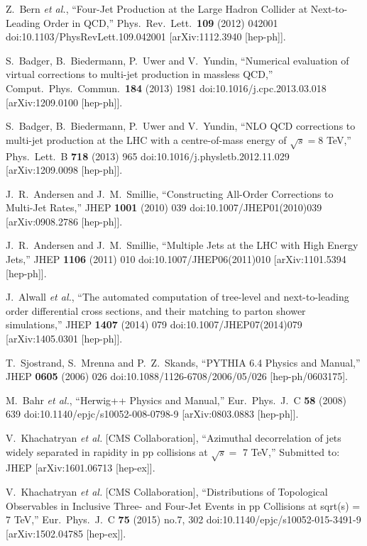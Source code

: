 \documentclass{PoS}
\begin{document}
\begin{thebibliography}{99}
  Z.~Bern {\it et al.},
  ``Four-Jet Production at the Large Hadron Collider at Next-to-Leading Order in QCD,''
  Phys.\ Rev.\ Lett.\  {\bf 109} (2012) 042001
  doi:10.1103/PhysRevLett.109.042001
  [arXiv:1112.3940 [hep-ph]].

  S.~Badger, B.~Biedermann, P.~Uwer and V.~Yundin,
  ``Numerical evaluation of virtual corrections to multi-jet production in massless QCD,''
  Comput.\ Phys.\ Commun.\  {\bf 184} (2013) 1981
  doi:10.1016/j.cpc.2013.03.018
  [arXiv:1209.0100 [hep-ph]].

  S.~Badger, B.~Biedermann, P.~Uwer and V.~Yundin,
  ``NLO QCD corrections to multi-jet production at the LHC with a centre-of-mass energy of $\sqrt{s}=8$ TeV,''
  Phys.\ Lett.\ B {\bf 718} (2013) 965
  doi:10.1016/j.physletb.2012.11.029
  [arXiv:1209.0098 [hep-ph]].

  J.~R.~Andersen and J.~M.~Smillie,
  ``Constructing All-Order Corrections to Multi-Jet Rates,''
  JHEP {\bf 1001} (2010) 039
  doi:10.1007/JHEP01(2010)039
  [arXiv:0908.2786 [hep-ph]].

  J.~R.~Andersen and J.~M.~Smillie,
  ``Multiple Jets at the LHC with High Energy Jets,''
  JHEP {\bf 1106} (2011) 010
  doi:10.1007/JHEP06(2011)010
  [arXiv:1101.5394 [hep-ph]].

  J.~Alwall {\it et al.},
  ``The automated computation of tree-level and next-to-leading order differential cross sections, and their matching to parton shower simulations,''
  JHEP {\bf 1407} (2014) 079
  doi:10.1007/JHEP07(2014)079
  [arXiv:1405.0301 [hep-ph]].

  T.~Sjostrand, S.~Mrenna and P.~Z.~Skands,
  ``PYTHIA 6.4 Physics and Manual,''
  JHEP {\bf 0605} (2006) 026
  doi:10.1088/1126-6708/2006/05/026
  [hep-ph/0603175].

  M.~Bahr {\it et al.},
  ``Herwig++ Physics and Manual,''
  Eur.\ Phys.\ J.\ C {\bf 58} (2008) 639
  doi:10.1140/epjc/s10052-008-0798-9
  [arXiv:0803.0883 [hep-ph]].

  V.~Khachatryan {\it et al.} [CMS Collaboration],
  ``Azimuthal decorrelation of jets widely separated in rapidity in pp collisions at $\sqrt{s} =$ 7 TeV,''
  Submitted to: JHEP
  [arXiv:1601.06713 [hep-ex]].

  V.~Khachatryan {\it et al.} [CMS Collaboration],
  ``Distributions of Topological Observables in Inclusive Three- and Four-Jet Events in pp Collisions at sqrt(s) = 7 TeV,''
  Eur.\ Phys.\ J.\ C {\bf 75} (2015) no.7,  302
  doi:10.1140/epjc/s10052-015-3491-9
  [arXiv:1502.04785 [hep-ex]].


\end{thebibliography}
\end{document}
